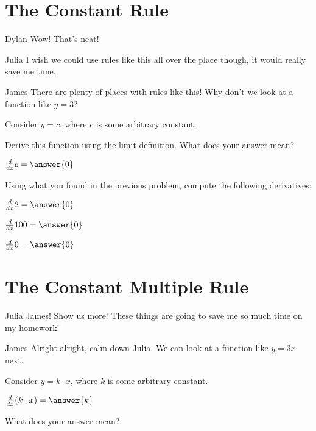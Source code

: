 \documentclass{ximera}
\begin{document}
\section{The Constant Rule}
\begin{dialogue}
\item[Dylan] Wow! That's neat!
\item[Julia] I wish we could use rules like this all over the place though, it would really save me time.
\item[James] There are plenty of places with rules like this! Why don't we look at a function like $y = 3$?
\end{dialogue}

Consider $y = c$, where $c$ is some arbitrary constant.
\begin{question}
Derive this function using the limit definition. What does your answer mean?

$ \frac{d}{dx} c =  \answer{0}$
\begin{freeResponse}
\end{freeResponse}
\end{question}

\begin{question}
Using what you found in the previous problem, compute the following derivatives:

$\frac{d}{dx} 2 =  \answer{0}$

$\frac{d}{dx} 100 =  \answer{0}$

$ \frac{d}{dx} 0 =  \answer{0}$

\end{question}

\section{The Constant Multiple Rule}
\begin{dialogue}
\item[Julia] James! Show us more! These things are going to save me so much time on my homework!
\item[James] Alright alright, calm down Julia. We can look at a function like $y = 3x$ next.
\end{dialogue}

Consider $y = k \cdot x$, where $k$ is some arbitrary constant.
\begin{question}
$\frac{d}{dx} (k \cdot x) =  \answer{k}$

\item{What does your answer mean?}

\begin{freeResponse}

\end{freeResponse}
\end{question}
\end{document}
